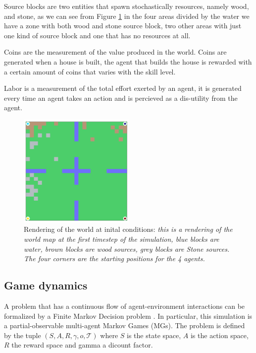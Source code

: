 Source blocks are two entities that spawn stochastically resources, namely wood, and stone, as we can see from Figure \ref{img:map_0} in the four areas divided by the water we have a zone with both wood and stone source block, two other areas with just one kind of source block and one that has no resources at all. 

Coins are the measurement of the value produced in the world. Coins are generated when a house is built, the agent that builds the house is rewarded with a certain amount of coins that varies with the skill level.

Labor is a measurement of the total effort exerted by an agent, it is generated every time an agent takes an action and is percieved as a dis-utility from the agent.


\begin{figure}[h!]
    \centering
    \linespread{.9} 
    \includegraphics[width=0.5\textwidth]{Resources/imgs/Map_0.png}
    \caption[Rendering of the world at inital conditions: ]%
    {\label{img:map_0}Rendering of the world at inital conditions: \small \textit{this is a rendering of the world map at the first timestep of the simulation, blue blocks are water, brown blocks are wood sources, grey blocks are Stone sources. The four corners are the starting positions for the 4 agents.}}
\end{figure}



\subsection{Game dynamics}

A problem that has a continuous flow of agent-environment interactions can be formalized by a Finite Markov Decision problem \cite{sutton2018reinforcement}. In particular, this simulation is a partial-observable multi-agent Markov Games (MGs). The problem is defined by the tuple \(\left(  S,A,R ,\gamma, o, \mathcal{T} \right) \) where \( S \) is the state space, \( A \) is the action space, \( R \) the reward space and gamma a dicount factor. 

